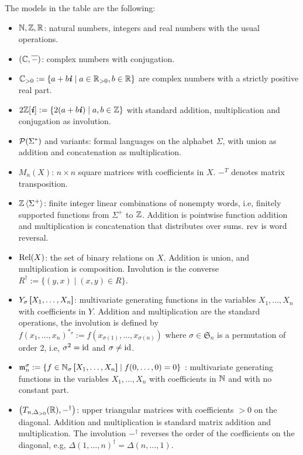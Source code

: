 \noindent The models in the table are the following:
\begin{itemize}
  \item $\N, \Z, \R$: natural numbers, integers and real numbers with the usual operations.
  \item $(\C, \overline{-})$: complex numbers with conjugation.
  \item $\C_{>0} := \{a + b\ii \mid a \in \R_{>0}, b \in \R \}$ are complex numbers with a strictly positive real part.
  \item $2\Z[\ii] := \{2(a + b\ii) \mid a, b \in \Z\}$ with standard addition, multiplication and conjugation as involution.
  \item $\P(\Sigma^*)$ and variants: formal languages on the alphabet $\Sigma$, with union as addition and concatenation as multiplication.
  \item $M_n(X)$: $n\times n$ square matrices with coefficients in $X$. $-^T$ denotes matrix transposition.
  \item $\Z \la \Sigma^+ \ra$: finite integer linear combinations of nonempty words, i.e, finitely supported functions from $\Sigma^+$ to $\Z$. Addition is pointwise function addition and multiplication is concatenation that distributes over sums. $\rev$ is word reversal.
  \item $\Rel(X)$: the set of binary relations on $X$. Addition is union, and multiplication is composition. Involution is the converse $R^\dagger := \{(y, x) \mid (x, y) \in R\}$.
  \item $Y_\sigma\brak{X_1, \dots, X_n}$: multivariate generating functions in the variables $X_1, \dots, X_n$ with coefficients in $Y$. Addition and multiplication are the standard operations, the involution is defined by $f(x_1, \dots, x_n)^{\ast_\sigma} := f(x_{\sigma(1)}, \dots, x_{\sigma(n)})$ where $\sigma \in \mathfrak S_n$ is a permutation of order 2, i.e, $\sigma^2 = \id$ and $\sigma \neq \id$.
  \item $\mathfrak m_n^\sigma := \{f \in \N_\sigma\brak{X_1, \dots, X_n} \mid f(0, \dots, 0) = 0 \}$ : multivariate generating functions in the variables $X_1, \dots, X_n$ with coefficients in $\N$ and with no constant part.
  \item $\bigl( T_{n,\Delta_{>0}}(\R), -^\dagger \bigr)$: upper triangular matrices with coefficients $>0$ on the diagonal. Addition and multiplication is standard matrix addition and multiplication. The involution $-^\dagger$ reverses the order of the coefficients on the diagonal, e.g, $\Delta(1, \dots, n)^\dagger = \Delta(n, \dots, 1)$.
\end{itemize}

